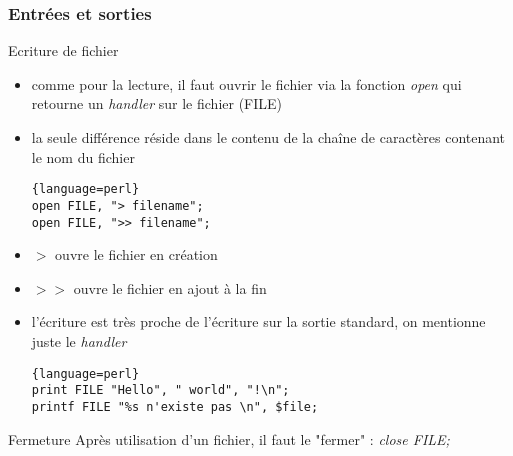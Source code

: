 \begin{frame}[fragile]
  \frametitle{Entrées et sorties}

  \begin{block}{Ecriture de fichier}
    \begin{itemize}
    \item comme pour la lecture, il faut ouvrir le fichier via la fonction
      \textit{open} qui retourne un \textit{handler} sur le fichier (FILE)
    \item la seule différence réside dans le contenu de la chaîne de
      caractères contenant le nom du fichier
      \begin{lstlisting}{language=perl}
open FILE, "> filename";
open FILE, ">> filename";
      \end{lstlisting}
    \item $>$ ouvre le fichier en création
    \item $>>$ ouvre le fichier en ajout à la fin
    \item l'écriture est très proche de l'écriture sur la sortie
      standard, on mentionne juste le \textit{handler}
      \begin{lstlisting}{language=perl}
print FILE "Hello", " world", "!\n";
printf FILE "%s n'existe pas \n", $file;
      \end{lstlisting}
    \end{itemize}
  \end{block}

  \begin{alertblock}{Fermeture}
    Après utilisation d'un fichier, il faut le "fermer" : \textit{close FILE;}
  \end{alertblock}

\end{frame}

